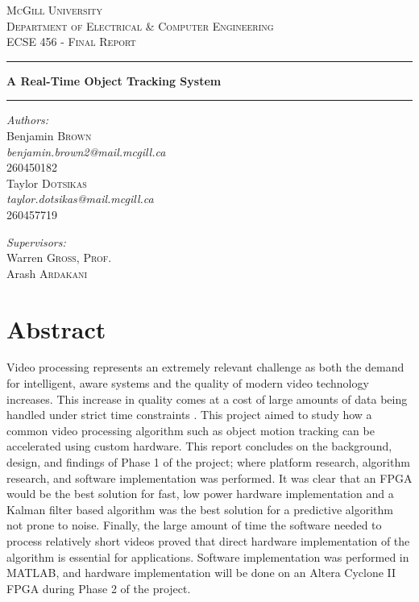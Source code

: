 \documentclass[11pt]{article} %
\newcommand{\HRule}[1][\medskipamount]{\par
  \vspace*{\dimexpr-\parskip-\baselineskip+#1}
  \noindent\rule{\linewidth}{0.2mm}\par
  \vspace*{\dimexpr-\parskip-.5\baselineskip+#1}}
\begin{document}
\begin{titlepage}
\begin{center}
\textsc{\huge McGill University}\\[1.5cm]
\textsc{\LARGE Department of Electrical \& Computer Engineering}\\[1.5cm]
\textsc{\Large ECSE 456 - Final Report}\\[3cm]
\HRule
{\huge \bfseries A Real-Time Object Tracking System \\[.3cm] }
\HRule 
\vspace{1.5cm}
\noindent
\begin{minipage}{0.4\textwidth}
\begin{flushleft} \large
\emph{\Large Authors:}\\
\vspace{.2cm}
Benjamin \textsc{Brown} \\
\textit{benjamin.brown2@mail.mcgill.ca} \\
260450182 \\
\vspace{.2cm}
Taylor \textsc{Dotsikas} \\
\textit{taylor.dotsikas@mail.mcgill.ca} \\
260457719
\end{flushleft}
\begin{flushleft} \large
\emph{\Large Supervisors:}\\
\vspace{.2cm}
Warren \textsc{Gross, Prof.}\\
\vspace{.2cm}
Arash \textsc{Ardakani} 
\end{flushleft}
\end{minipage}%
\end{center}
\end{titlepage}
\pagebreak
\section*{Abstract}
Video processing represents an extremely relevant challenge as both the demand for intelligent, aware systems and the quality of modern video technology increases. This increase in quality comes at a cost of large amounts of data being handled under strict time constraints \cite{3}. This project aimed to study how a common video processing algorithm such as object motion tracking can be accelerated using custom hardware. This report concludes on the background, design, and findings of Phase 1 of the project; where platform research, algorithm research, and software implementation was performed. It was clear that an FPGA would be the best solution for fast, low power hardware implementation and a Kalman filter based algorithm was the best solution for a predictive algorithm not prone to noise. Finally, the large amount of time the software needed to process relatively short videos proved that direct hardware implementation of the algorithm is essential for applications. Software implementation was performed in MATLAB, and hardware implementation will be done on an Altera Cyclone II FPGA during Phase 2 of the project.
\end{document}
